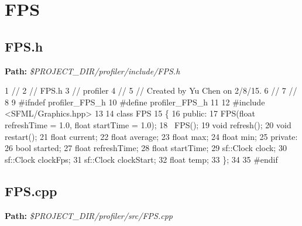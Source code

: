  \hypertarget{_benchmark_program_BenchmarkProgramFPS}{}\section{F\+P\+S}\label{_benchmark_program_BenchmarkProgramFPS}
\hypertarget{_benchmark_program_BenchmarkProgramFPS_h}{}\subsection{F\+P\+S.\+h}\label{_benchmark_program_BenchmarkProgramFPS_h}
{\bfseries Path\+:} {\itshape \$\+P\+R\+O\+J\+E\+C\+T\+\_\+\+D\+I\+R/profiler/include/\+F\+P\+S.h} 
\begin{DoxyCodeInclude}
1 \textcolor{comment}{//}
2 \textcolor{comment}{//  FPS.h}
3 \textcolor{comment}{//  profiler}
4 \textcolor{comment}{//}
5 \textcolor{comment}{//  Created by Yu Chen on 2/8/15.}
6 \textcolor{comment}{//}
7 \textcolor{comment}{//}
8 
9 \textcolor{preprocessor}{#ifndef profiler\_FPS\_h}
10 \textcolor{preprocessor}{#define profiler\_FPS\_h}
11 
12 \textcolor{preprocessor}{#include <SFML/Graphics.hpp>}
13 
14 \textcolor{keyword}{class }FPS
15 \{
16 \textcolor{keyword}{public}:
17     FPS(\textcolor{keywordtype}{float} refreshTime = 1.0, \textcolor{keywordtype}{float} startTime = 1.0);
18     ~FPS();
19     \textcolor{keywordtype}{void} refresh();
20     \textcolor{keywordtype}{void} restart();
21     \textcolor{keywordtype}{float} current;
22     \textcolor{keywordtype}{float} average;
23     \textcolor{keywordtype}{float} max;
24     \textcolor{keywordtype}{float} min;
25 \textcolor{keyword}{private}:
26     \textcolor{keywordtype}{bool} started;
27     \textcolor{keywordtype}{float} refreshTime;
28     \textcolor{keywordtype}{float} startTime;
29     sf::Clock clock;
30     sf::Clock clockFps;
31     sf::Clock clockStart;
32     \textcolor{keywordtype}{float} temp;
33 \};
34 
35 \textcolor{preprocessor}{#endif}
\end{DoxyCodeInclude}
 \hypertarget{_benchmark_program_BenchmarkProgramFPS_cpp}{}\subsection{F\+P\+S.\+cpp}\label{_benchmark_program_BenchmarkProgramFPS_cpp}
{\bfseries Path\+:} {\itshape \$\+P\+R\+O\+J\+E\+C\+T\+\_\+\+D\+I\+R/profiler/src/\+F\+P\+S.cpp} 

